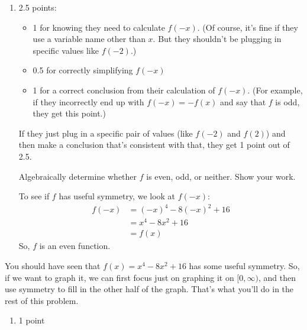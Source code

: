 \documentclass{article}
\begin{document}
\begin{enumerate}[resume]
\begin{enumerate}
  \item

    \begin{grading}
      2.5 points:
      \begin{itemize}[nosep]
      \item 1 for knowing they need to calculate $f(-x)$. (Of course, it's fine if they use a variable name other than $x$. But they shouldn't be plugging in specific values like $f(-2)$.) 
      \item 0.5 for correctly simplifying $f(-x)$
      \item 1 for a correct conclusion from their calculation of $f(-x)$. (For example, if they incorrectly end up with $f(-x) = - f(x)$ and say that $f$ is odd, they get this point.) 
      \end{itemize}
      If they just plug in a specific pair of values (like $f(-2)$ and $f(2)$) and then make a conclusion that's consistent with that, they get 1 point out of 2.5.
    \end{grading}

    \begin{problem}[\vfill\newpage]
      Algebraically determine whether $f$ is even, odd, or neither. Show your work. 
    \end{problem}

    \begin{solution}
      To see if $f$ has useful symmetry, we look at $f(-x)$:
      \begin{align*}
        f(-x) &= (-x)^4 - 8 (-x)^2 + 16 \\
        &= x^4 - 8 x^2 + 16 \\
        &= f(x)
      \end{align*}
      So, $f$ is an even function.
    \end{solution}

  \end{enumerate}

  You should have seen that $f(x) = x^4 - 8x^2 + 16$ has some useful symmetry. So, if we want to graph it, we can first focus just on graphing it on $[0, \infty)$, and then use symmetry to fill in the other half of the graph. That's what you'll do in the rest of this problem.

  \begin{enumerate}[resume]
  \item

    \begin{grading}
      1 point
    \end{grading}


\end{enumerate}
\end{enumerate}
\end{document}
